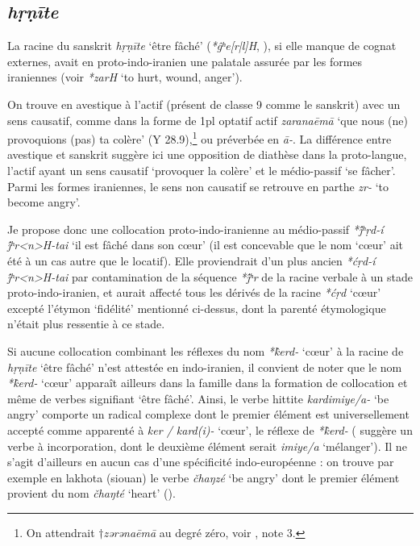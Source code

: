 \documentclass{article}
\newcommand{\ipa}[1]{{\phon\textit{#1}}}
\begin{document}

\subsection{\ipa{hṛṇīte}} \label{sec:hrnite}
La racine du sanskrit \ipa{hṛṇīte} `être fâché' (\ipa{*ĝʰe[r|l]H}, \citealt[178]{liv}), si elle manque de cognat externes, avait en proto-indo-iranien une palatale assurée par les formes iraniennes (voir \citealt[469]{cheung07dictionary} \ipa{*zarH} ‘to hurt, wound, anger’). 

On trouve en avestique à l'actif (présent de classe 9 comme le sanskrit) avec un sens causatif, comme dans la forme de 1pl optatif actif \ipa{zaranaēmā} `que nous (ne) provoquions (pas) ta colère' (Y 28.9),\footnote{On attendrait $\dagger$\ipa{zərənaēmā} au degré zéro, voir \citet[178]{liv}, note 3.  } ou préverbée en \ipa{ā-}. La différence entre avestique et sanskrit suggère ici une opposition de diathèse dans la proto-langue, l'actif ayant un sens causatif `provoquer la colère' et le médio-passif `se fâcher'. Parmi les formes iraniennes, le sens non causatif se retrouve en parthe \ipa{zr-} `to become angry'.

Je propose donc une collocation proto-indo-iranienne au médio-passif \ipa{*j́ʰṛd-í j́ʰr<n>H-tai} `il est fâché dans son cœur' (il est concevable que le nom `cœur' ait été à un cas autre que le locatif).  Elle proviendrait d'un plus ancien \ipa{*ćṛd-í j́ʰr<n>H-tai} par contamination de la séquence \ipa{*j́ʰr} de la racine verbale à un stade proto-indo-iranien, et aurait affecté tous les dérivés de la racine \ipa{*ćṛd} `cœur' excepté l'étymon `fidélité' mentionné ci-dessus, dont la parenté étymologique n'était plus ressentie à ce stade.

Si aucune collocation combinant les réflexes du nom \ipa{*k̂erd-} `cœur' à la racine de \ipa{hṛṇīte} `être fâché' n'est attestée en indo-iranien, il convient de noter que  le nom \ipa{*k̂erd-} `cœur' apparaît ailleurs dans la famille dans  la formation de collocation et même de verbes signifiant `être fâché'. Ainsi, le verbe hittite  \ipa{kardimiye/a-} `be angry' comporte un radical complexe dont le premier élément est universellement accepté comme apparenté à \ipa{ker / kard(i)-} `cœur', le réflexe de \ipa{*k̂erd-} (\citealt[456-7]{kloekhorst08edhil} suggère un verbe à incorporation, dont le deuxième élément serait \ipa{imiye/a} `mélanger'). Il ne s'agit d'ailleurs en aucun cas d'une spécificité indo-européenne : on trouve par exemple en lakhota (siouan) le verbe  \ipa{čhaŋzé} `be angry' dont le premier élément provient du nom \ipa{čhaŋté} `heart' (\citealt{ullrich08}).
\end{document}
